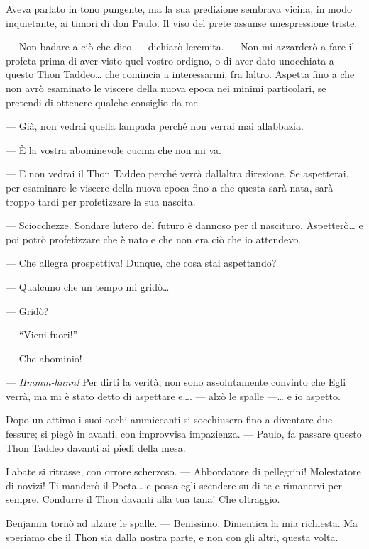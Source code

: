 Aveva parlato in tono pungente, ma la sua predizione sembrava vicina, in
modo inquietante, ai timori di don Paulo. Il viso del prete assunse
un\textquotesingle espressione triste.

--- Non badare a ciò che dico --- dichiarò l\textquotesingle eremita.
--- Non mi azzarderò a fare il profeta prima di aver visto quel vostro
ordigno, o di aver dato un\textquotesingle occhiata a questo Thon
Taddeo\ldots{} che comincia a interessarmi, fra l\textquotesingle altro.
Aspetta fino a che non avrò esaminato le viscere della nuova epoca nei
minimi particolari, se pretendi di ottenere qualche consiglio da me.

--- Già, non vedrai quella lampada perché non verrai mai
all\textquotesingle abbazia.

--- È la vostra abominevole cucina che non mi va.

--- E non vedrai il Thon Taddeo perché verrà dall\textquotesingle altra
direzione. Se aspetterai, per esaminare le viscere della nuova epoca
fino a che questa sarà nata, sarà troppo tardi per profetizzare la sua
nascita.

--- Sciocchezze. Sondare l\textquotesingle utero del futuro è dannoso
per il nascituro. Aspetterò\ldots{} e poi potrò profetizzare che è nato
e che non era ciò che io attendevo.

--- Che allegra prospettiva! Dunque, che cosa stai aspettando?

--- Qualcuno che un tempo mi gridò\ldots{}

--- Gridò?

--- ``Vieni fuori!''

--- Che abominio!

--- \emph{Hmmm-hnnn!} Per dirti la verità, non sono assolutamente
convinto che Egli verrà, ma mi è stato detto di aspettare e\ldots. ---
alzò le spalle ---\ldots{} e io aspetto.

Dopo un attimo i suoi occhi ammiccanti si socchiusero fino a diventare
due fessure; si piegò in avanti, con improvvisa impazienza. --- Paulo,
fa\textquotesingle{} passare questo Thon Taddeo davanti ai piedi della
mesa.

L\textquotesingle abate si ritrasse, con orrore scherzoso. ---
Abbordatore di pellegrini! Molestatore di novizi! Ti manderò il
Poeta\ldots{} e possa egli scendere su di te e rimanervi per sempre.
Condurre il Thon davanti alla tua tana! Che oltraggio.

Benjamin tornò ad alzare le spalle. --- Benissimo. Dimentica la mia
richiesta. Ma speriamo che il Thon sia dalla nostra parte, e non con gli
altri, questa volta.

